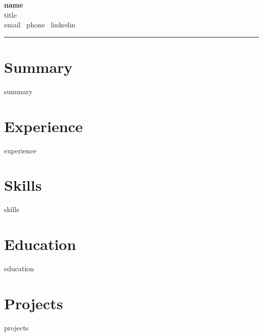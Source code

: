 \documentclass[11pt]{article}
\begin{document}
\pagestyle{empty}
\begin{center}
  {\LARGE\bfseries {name}}\\
  {\small {title}}\\
  {\small {email} \textbar\ {phone} \textbar\ {linkedin}}\\[10pt]
  \noindent\rule{0.9\linewidth}{0.4pt}
\end{center}

\section*{Summary}
{summary}

\section*{Experience}
{experience}

\section*{Skills}
{skills}

\section*{Education}
{education}

\section*{Projects}
{projects}
\end{document}
